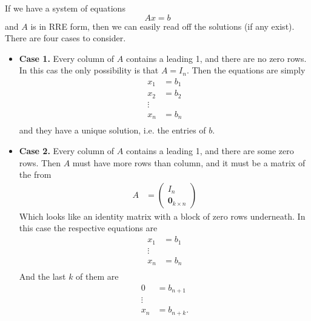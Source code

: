 \documentclass[11pt,a4paper]{article}
\theoremstyle{definition}
\begin{document}
If we have a system of equations 
\[ Ax = b\]
and $ A $ is in RRE form, then we can easily read off the solutions (if any exist). There are four cases to consider.
\begin{itemize}
    \item \textbf{Case 1.} Every column of $A$ contains a leading 1, and there are no zero rows. In this cas the only possibility is that $ A = I_n $.
    Then the equations are simply
    \begin{equation}
        \begin{split}
            x_1 &= b_1 \\
            x_2 &= b_2 \\
            \vdots & \\
            x_n &= b_n \\
        \end{split}
    \end{equation}
    and they have a unique solution, i.e. the entries of $b$.
    \item \textbf{Case 2.} Every column of $A$ contains a leading 1, and there are some zero rows. Then $A$ must have more rows than column, and it must be a matrix of the from
    \begin{align}
        A &= \begin{pmatrix}
            I_n \\
            \textbf{0}_{k \times n}
        \end{pmatrix}
    \end{align}
    Which looks like an identity matrix with a block of zero rows underneath. In this case the respective equations are 
    \begin{equation}
        \begin{split}
            x_1 &= b_1 \\
            \vdots & \\
            x_n &= b_n \\
        \end{split}
    \end{equation}
    And the last $k$ of them are
    \begin{equation}
        \begin{split}
            0 &= b_{n+1} \\
            \vdots & \\
            x_n &= b_{n + k}. \\
        \end{split}
    \end{equation}

\end{itemize}
\end{document}
